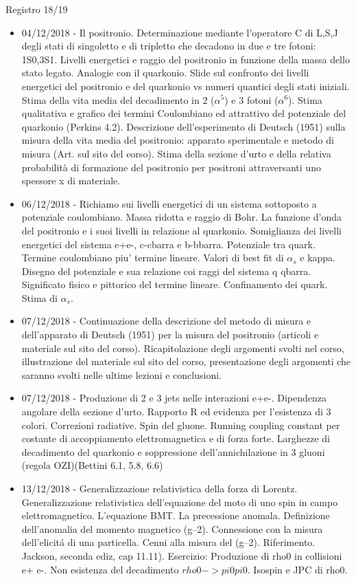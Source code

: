 \begin{frame}[allowframebreaks]{Registro 18/19}
\begin{itemize}
\item 04/12/2018 - Il positronio. Determinazione mediante l'operatore C di L,S,J degli stati di singoletto e di tripletto che decadono in due e tre fotoni: 1S0,3S1. Livelli energetici e raggio del positronio in funzione della massa dello stato legato. Analogie con il quarkonio. Slide sul confronto dei livelli energetici del positronio e del quarkonio vs numeri quantici degli stati iniziali. Stima della vita media del decadimento in 2 ($\alpha^5$) e 3 fotoni ($\alpha^6$). Stima qualitativa e grafico dei termini Coulombiano ed attrattivo del potenziale del quarkonio (Perkins 4.2). Descrizione dell'esperimento di Deutsch (1951) sulla misura della vita media del positronio: apparato sperimentale e metodo di misura (Art. sul sito del corso). Stima della sezione d'urto e della relativa probabilità di formazione del positronio per positroni attraversanti uno spessore x di materiale.
\item 06/12/2018 - Richiamo sui livelli energetici di un sistema sottoposto a potenziale coulombiano. Massa ridotta e raggio di Bohr. La funzione d'onda del positronio e i suoi livelli in relazione al quarkonio. Somiglianza dei livelli energetici del sistema e+e-, c-cbarra e b-bbarra. Potenziale tra quark. Termine coulombiano piu' termine lineare. Valori di best fit di $\alpha_s$ e kappa. Disegno del potenziale e sua relazione coi raggi del sistema q qbarra. Significato fisico e pittorico del termine lineare. Confinamento dei quark. Stima di $\alpha_s$.
\item 07/12/2018 - Continuazione della descrizione del metodo di misura e dell'apparato di Deutsch (1951) per la misura del positronio (articoli e materiale sul sito del corso). Ricapitolazione degli argomenti svolti nel corso, illustrazione del materiale sul sito del corso, presentazione degli argomenti che saranno svolti nelle ultime lezioni e conclusioni.
\item 07/12/2018 - Produzione di 2 e 3 jets nelle interazioni e+e-. Dipendenza angolare della sezione d'urto. Rapporto R ed evidenza per l'esistenza di 3 colori. Correzioni radiative. Spin del gluone. Running coupling constant per costante di accoppiamento elettromagnetica e di forza forte. Larghezze di decadimento del quarkonio e soppressione dell'annichilazione in 3 gluoni (regola OZI)(Bettini 6.1, 5.8, 6.6)
\item 13/12/2018 - Generalizzazione relativistica della forza di Lorentz. Generalizzazione relativistica dell'equazione del moto di uno spin in campo elettromagnetico. L'equazione BMT. La precessione anomala. Definizione dell'anomalia del momento magnetico (g–2). Connessione con la misura dell'elicit\'a di una particella. Cenni alla misura del (g–2). Riferimento. Jackson, seconda ediz, cap 11.11). Esercizio: Produzione di rho0 in collisioni e+ e-. Non esistenza del decadimento $rho0-> pi0 pi0$. Isospin e JPC di rho0.
\end{itemize}
\end{frame}

